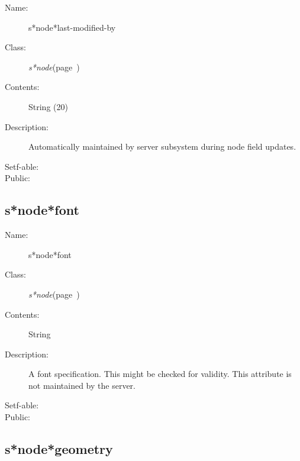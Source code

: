 \begin{description}

\item [Name:]  s*node*last-modified-by

\item [Class:] {\sl s*node}\hfill(page~\pageref{s*node})

\item [Contents:] String (20)

\item [Description:]
Automatically maintained by server subsystem
during node field updates.

\item [Setf-able:]

\item [Public:]



\end{description}
\horizontalline

\subsection{s*node*font}
\label{s*node*font}

\begin{description}

\item [Name:]  s*node*font

\item [Class:] {\sl s*node}\hfill(page~\pageref{s*node})

\item [Contents:] String

\item [Description:]
A font specification.  This might be checked
for validity.  This attribute is not
maintained by the server.

\item [Setf-able:]


\item [Public:]



\end{description}
\horizontalline

\subsection{s*node*geometry}
\label{s*node*geometry}

